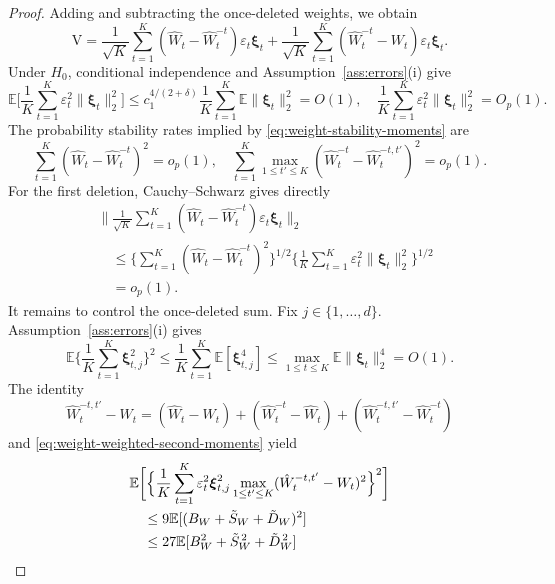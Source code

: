 \documentclass[12pt]{article}
\def\E{\mathbb{E}}
\newcommand{\Rajen}[1]{{ \color{red} Rajen: #1}}
\numberwithin{equation}{section}
\begin{document}
\begin{proof}
Adding and subtracting the once-deleted weights, we obtain 
\[
\mathrm V
=\frac1{\sqrt K}\sum_{t=1}^K
(\hat W_t-\hat W_t^{-t})\varepsilon_t\boldsymbol\xi_t
+\frac1{\sqrt K}\sum_{t=1}^K
(\hat W_t^{-t}-W_t)\varepsilon_t\boldsymbol\xi_t.
\]
Under \(H_0\), conditional independence and
Assumption~\ref{ass:errors}(i) give
\[
\E\Big[\frac1K\sum_{t=1}^K
\varepsilon_t^2\|\boldsymbol\xi_t\|_2^2\Big]
\leq c_1^{4/(2+\delta)}\frac1K\sum_{t=1}^K
\E\|\boldsymbol\xi_t\|_2^2=O(1),
\quad
\frac1K\sum_{t=1}^K
\varepsilon_t^2\|\boldsymbol\xi_t\|_2^2=O_p(1).
\]
The probability stability rates implied by
\eqref{eq:weight-stability-moments} are
\begin{equation}
\label{eq:weight-V-probability-stability}
\sum_{t=1}^K(\hat W_t-\hat W_t^{-t})^2=o_p(1),
\quad
\sum_{t=1}^K\max_{1\leq t'\leq K}
(\hat W_t^{-t}-\hat W_t^{-t,t'})^2=o_p(1).
\end{equation}
For the first deletion, Cauchy--Schwarz gives directly
\begin{equation}
\label{eq:weight-V-first-deletion}
\begin{aligned}
&\Big\|\frac1{\sqrt K}\sum_{t=1}^K
(\hat W_t-\hat W_t^{-t})
\varepsilon_t\boldsymbol\xi_t\Big\|_2\\
&\quad\leq
\Big\{\sum_{t=1}^K(\hat W_t-\hat W_t^{-t})^2\Big\}^{1/2}
\Big\{\frac1K\sum_{t=1}^K
\varepsilon_t^2\|\boldsymbol\xi_t\|_2^2\Big\}^{1/2}\\
&\quad=o_p(1).
\end{aligned}
\end{equation}
It remains to control the once-deleted sum. Fix
\(j\in\{1,\ldots,d\}\). Assumption~\ref{ass:errors}(i) gives
\begin{equation}
\label{eq:weight-V-exposure-moment}
\E\Big\{\frac1K\sum_{t=1}^K\boldsymbol\xi_{t,j}^2\Big\}^{2}
\leq\frac1K\sum_{t=1}^K\E[\boldsymbol\xi_{t,j}^4]
\leq\max_{1\leq t\leq K}\E\|\boldsymbol\xi_t\|_2^4=O(1).
\end{equation}
The identity
\[
\hat W_t^{-t,t'}-W_t
=(\hat W_t-W_t)+(\hat W_t^{-t}-\hat W_t)
+(\hat W_t^{-t,t'}-\hat W_t^{-t})
\]
and \eqref{eq:weight-weighted-second-moments} yield
\begin{align}
&\E\bigg[\Big\{\frac1K\sum_{t=1}^K
\varepsilon_t^2\boldsymbol\xi_{t,j}^2
\max_{1\leq t'\leq K}
(\hat W_t^{-t,t'}-W_t)^2\Big\}^{2}\bigg]\notag\\
&\quad\leq9\E[(B_W+\tilde S_W+\tilde D_W)^2]\notag\\
&\quad\leq27\E[B_W^2+\tilde S_W^{\,2}+\tilde D_W^{\,2}]

\end{align}
\end{proof}
\end{document}
